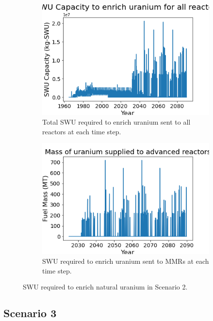 \begin{figure}
    \centering
    \begin{subfigure}{0.4\textwidth}
        \centering
        \includegraphics[scale=0.3]{figures/totalswu_scenarios_2.png}
        \caption{Total \gls{SWU} required to enrich uranium sent to all reactors at each time step.}
        \label{fig:totalswu_2}
    \end{subfigure}
    \begin{subfigure}{0.4\textwidth}
        \centering
        \includegraphics[scale=0.3]{figures/advancedRX_fuelsupply_scenarios_2.png}
        \caption{\gls{SWU} required to enrich uranium sent to \glspl{MMR} at each time step.}
        \label{fig:haleuswu_2}
    \end{subfigure}
    \caption{\gls{SWU} required to enrich natural uranium in Scenario 2.}
    \label{fig:swu_2}
\end{figure}

\subsection{Scenario 3}

